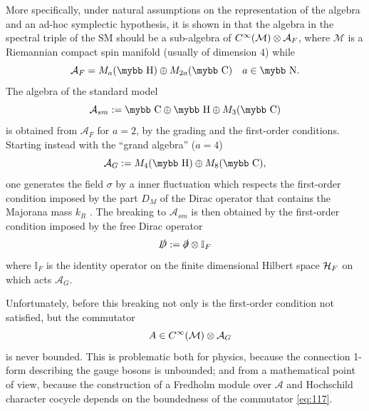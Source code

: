 \documentclass[11pt]{article}
\newcommand{\cinf}{{C^\infty({\cal M})}}
\newcommand{\M}{\mathcal M}
\newcommand{\A}{\mathcal A}
\newcommand{\ds}{\slashed \partial}
\newcommand{\Ds}{\slashed D}
\def\bb#1{\hbox{\mybb#1}}
\begin{document}
More specifically, under natural assumptions on the representation of
the algebra and an ad-hoc symplectic hypothesis, it is shown in
\cite{Chamseddine:2008uq} that the algebra in the spectral triple of
the SM should be a sub-algebra of $\cinf\otimes \A_F$, where
$\M$ is a Riemannian compact spin manifold (usually of dimension $4$) while 
\begin{equation}
\A_F=M_a(\bb H) \oplus M_{2a}(\bb C) \quad a\in \bb N.
 \end{equation}
The algebra of the standard model
\begin{equation}
  \label{eq:115}
  \A_{sm}:= \bb C \oplus \bb H \oplus M_3(\bb C)
\end{equation}
is obtained
from $\A_F$ for $a=2$, by the grading and the first-order conditions. 
Starting instead with the ``grand algebra'' ($a=4$)
\begin{equation}
  \label{eq:116}
  \A_G := M_4(\bb H) \oplus M_8(\bb C),
\end{equation}
one generates the field
$\sigma$ by a inner fluctuation which respects the first-order
condition imposed by the part $D_M$ of the Dirac
operator that contains the Majorana mass $k_R$ \cite{Devastato:2013fk}.  The breaking to $\A_{sm}$
is then obtained by the first-order
condition imposed by the free Dirac operator
\begin{equation}
\Ds:=\ds\otimes
{\mathbb I}_F
\label{eq:89}
\end{equation}
where ${\mathbb I}_F$ is the identity operator on the finite
dimensional Hilbert space ${\cal H}_F$ on which acts $\A_G$.

Unfortunately, before this breaking not
only is the first-order condition not satisfied, but the commutator
\begin{equation}
[\Ds, A] \quad A\in \cinf\otimes \A_G
\label{eq:117}
\end{equation}
is never bounded. This is problematic both for physics, because the
connection 1-form describing the gauge bosons is unbounded; and
from a mathematical point of view, because the construction of a
Fredholm module over $\A$ and Hochschild character cocycle depends on
the boundedness of the commutator \eqref{eq:117}.
\end{document}
